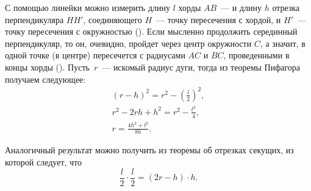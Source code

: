 С помощью линейки можно измерить длину $l$ хорды $AB$~--- и длину $h$ отрезка перпендикуляра $HH'$, соединяющего $H$~--- точку пересечения с хордой,  и $H'$~--- точку пересечения с окружностью (). Если мысленно продолжить серединный перпендикуляр, то он, очевидно, пройдет через центр окружности $C$, а значит, в одной точке (в центре) пересечется с радиусами $AC$ и $BC$, проведенными в концы хорды (). Пусть~$r$~--- искомый радиус дуги, тогда из теоремы Пифагора получаем следующее:
\begin{gather*}
    (r - h)^2 = r^2 - \left( \frac{l}{2} \right)^2,\\
    r^2 - 2rh + h^2 = r^2 - \frac{l^2}{4},\\
    r = \frac{4h^2 + l^2}{8h}.
\end{gather*}

Аналогичный результат можно получить из теоремы об отрезках секущих, из которой следует, что
\begin{equation*}
    \frac{l}{2} \cdot \frac{l}{2} = (2r - h) \cdot h.
\end{equation*}

